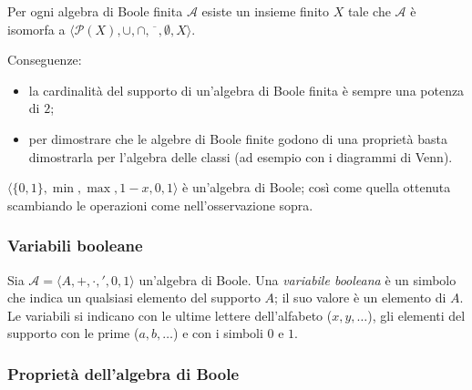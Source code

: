 \documentclass[11pt,a4paper]{article}
\begin{document}
\begin{teorema}
Per ogni algebra di Boole finita $\mathcal{A}$ esiste un insieme finito $X$ tale
che $\mathcal{A}$ è isomorfa a
$\langle \mathcal{P}(X), \cup, \cap, \overline{\phantom{x}}, \emptyset, X \rangle$.
\end{teorema}

Conseguenze:
\begin{itemize}
    \item la cardinalità del supporto di un'algebra di Boole finita è sempre una
          potenza di $2$;
    \item per dimostrare che le algebre di Boole finite godono di una proprietà
          basta dimostrarla per l'algebra delle classi (ad esempio con i
          diagrammi di Venn).
\end{itemize}

\begin{esempio}
$\langle \{0,1\}, \min, \max, 1-x, 0, 1 \rangle$ è un'algebra di Boole; così
come quella ottenuta scambiando le operazioni come nell'osservazione sopra.
\end{esempio}

\subsubsection{Variabili booleane}

Sia $\mathcal{A} = \langle A, +, \cdot, ', 0, 1 \rangle$ un'algebra di Boole. Una
\emph{variabile booleana} è un simbolo che indica un qualsiasi elemento del
supporto $A$; il suo valore è un elemento di $A$. Le variabili si indicano con
le ultime lettere dell'alfabeto ($x, y, \dots$), gli elementi del supporto con
le prime ($a, b, \dots$) e con i simboli $0$ e $1$.

\subsubsection{Proprietà dell'algebra di Boole}
\end{document}
